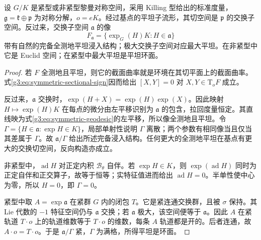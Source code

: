 \begin{proposition}\label{g3:prop:symmetric-flats-abelian}
	设 \(G/K\) 是紧型或非紧型黎曼对称空间，采用 Killing 型给出的标准度量，\(\mathfrak g=\mathfrak k\oplus\mathfrak p\) 为对称分解，\(o=eK\)。经过基点的平坦子流形，其切空间是 \(\mathfrak p\) 的交换子空间。反过来，交换子空间 \(\mathfrak a\) 的像
	\[
		F_{\mathfrak a}=\{\exp_G(H)K:H\in\mathfrak a\}
	\]
	带有自然的完备全测地平坦浸入结构；极大交换子空间对应最大平坦。在非紧型中它是 Euclid 空间；在紧型中最大平坦是平坦环面。
\end{proposition}
\begin{proof}
	若 \(F\) 全测地且平坦，则它的截面曲率就是环境在其切平面上的截面曲率。式\eqref{g3:eq:symmetric-sectional-sign}因而给出 \([X,Y]=0\) 对 \(X,Y\in\mathrm T_oF\) 成立。

	反过来，\(\mathfrak a\) 交换时，\(\exp(H+X)=\exp(H)\exp(X)\)。因此映射 \(H\mapsto\exp(H)K\) 在每点的微分由左平移识别为 \(\mathfrak a\) 的包含，拉回度量恒定。其直线映为式\eqref{g3:eq:symmetric-geodesic}的左平移，所以像全测地且平坦。令 \(\Gamma=\{H\in\mathfrak a:\exp H\in K\}\)，局部单射性说明 \(\Gamma\) 离散；两个参数有相同像当且仅当其差属于 \(\Gamma\)。故 \(\mathfrak a/\Gamma\) 给出所述完备浸入结构。任何更大的全测地平坦在基点有更大的交换切空间，反向构造亦成立。

	非紧型中，\(\operatorname{ad}H\) 对正定内积 \(\mathcal B_\theta\) 自伴。若 \(\exp H\in K\)，则 \(\exp(\operatorname{ad}H)\) 同时为正定自伴和正交算子，故等于恒等；实特征值进而给出 \(\operatorname{ad}H=0\)。半单性使中心为零，所以 \(H=0\)，即 \(\Gamma=0\)。

	紧型中取 \(A=\exp\mathfrak a\) 在紧群 \(G\) 内的闭包 \(T\)。它是紧连通交换群，且被 \(\sigma\) 保持。其 Lie 代数的 \(-1\) 特征空间仍与 \(\mathfrak a\) 交换；若 \(\mathfrak a\) 极大，该空间便等于 \(\mathfrak a\)。因此 \(A\) 在紧轨道 \(T\cdot o\) 上的轨道维数等于 \(T\cdot o\) 的维数，每条 \(A\) 轨道都是开的。后者连通，故 \(A\cdot o=T\cdot o\)。于是 \(\mathfrak a/\Gamma\) 紧，\(\Gamma\) 为满格，所得平坦是环面。
\end{proof}

